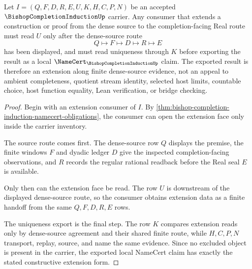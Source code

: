 \begin{theorem}
\label{thm:bishop-completion-induction-extension-principle}
Let $I=(Q,F,D,R,E,U,K,H,C,P,N)$ be an accepted $\BishopCompletionInductionUp$ carrier. Any consumer that extends a construction or proof from the dense source to the completion-facing Real route must read $U$ only after the dense-source route
$$
Q \longmapsto F \longmapsto D \longmapsto R \longmapsto E
$$
has been displayed, and must read uniqueness through $K$ before exporting the result as a local $\NameCert_{\BishopCompletionInductionUp}$ claim. The exported result is therefore an extension along finite dense-source evidence, not an appeal to ambient completeness, quotient stream identity, selected host limits, countable choice, host function equality, Lean verification, or bridge checking.
\end{theorem}
\begin{proof}
Begin with an extension consumer of $I$. By \autoref{thm:bishop-completion-induction-namecert-obligations}, the consumer can open the extension face only inside the carrier inventory.

The source route comes first. The dense-source row $Q$ displays the premise, the finite windows $F$ and dyadic ledger $D$ give the inspected completion-facing observations, and $R$ records the regular rational readback before the Real seal $E$ is available.

Only then can the extension face be read. The row $U$ is downstream of the displayed dense-source route, so the consumer obtains extension data as a finite handoff from the same $Q,F,D,R,E$ rows.

The uniqueness export is the final step. The row $K$ compares extension reads only by dense-source agreement and their shared finite route, while $H,C,P,N$ transport, replay, source, and name the same evidence. Since no excluded object is present in the carrier, the exported local NameCert claim has exactly the stated constructive extension form.
\end{proof}

